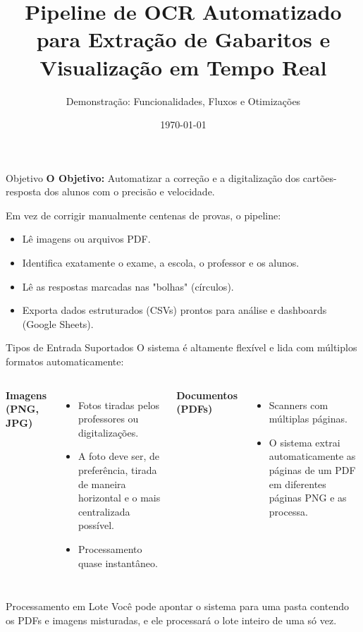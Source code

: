 \documentclass[aspectratio=169]{beamer}
\title[Pipeline de Extração de Gabaritos e Visualização em Tempo Real]{Pipeline de OCR Automatizado para Extração de Gabaritos e Visualização em Tempo Real}
\subtitle{Demonstração: Funcionalidades, Fluxos e Otimizações}
\date{\today}
\begin{document}
\begin{frame}
    \titlepage
\end{frame}

\begin{frame}{Objetivo}
    \textbf{O Objetivo:} Automatizar a correção e a digitalização dos cartões-resposta dos alunos com o precisão e velocidade.
    
    \vspace{0.5cm}
    Em vez de corrigir manualmente centenas de provas, o pipeline:
    \begin{itemize}
        \item Lê imagens ou arquivos PDF.
        \item Identifica exatamente o exame, a escola, o professor e os alunos.
        \item Lê as respostas marcadas nas "bolhas" (círculos).
        \item Exporta dados estruturados (CSVs) prontos para análise e dashboards (Google Sheets).
    \end{itemize}
\end{frame}

\begin{frame}{Tipos de Entrada Suportados}
    O sistema é altamente flexível e lida com múltiplos formatos automaticamente:
    
    \vspace{0.3cm}
    \begin{columns}
        \textbf{Imagens (PNG, JPG)}
        \begin{itemize}
            \item Fotos tiradas pelos professores ou digitalizações.
            \item A foto deve ser, de preferência, tirada de maneira horizontal e o mais centralizada possível.
            \item Processamento quase instantâneo.
        \end{itemize}
        
        \textbf{Documentos (PDFs)}
        \begin{itemize}
            \item Scanners com múltiplas páginas.
            \item O sistema extrai automaticamente as páginas de um PDF em diferentes páginas PNG e as processa.
        \end{itemize}
    \end{columns}
    
    \vspace{0.5cm}
    \begin{block}{Processamento em Lote}
        Você pode apontar o sistema para uma pasta contendo os PDFs e imagens misturadas, e ele processará o lote inteiro de uma só vez.
    \end{block}
\end{frame}
\end{document}
